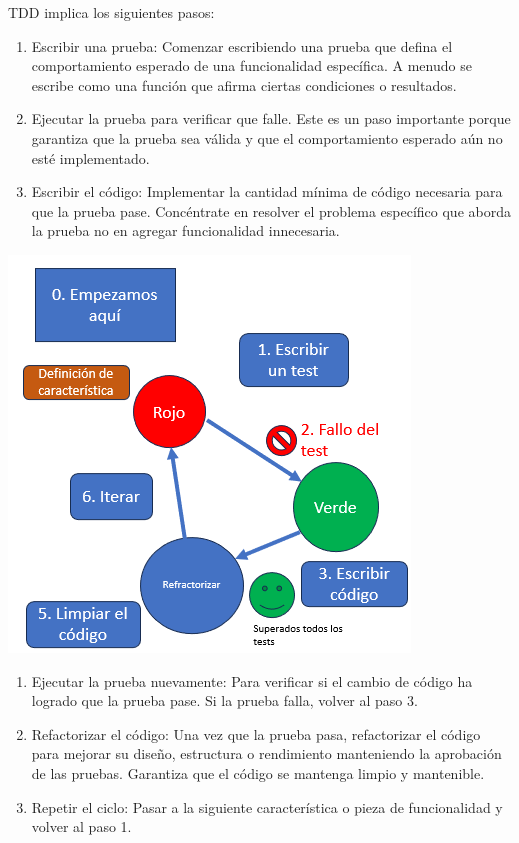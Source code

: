 \begin{minipage}{0.6\textwidth}
	TDD implica los siguientes pasos:
\begin{enumerate}[label=\arabic*)]
	\item Escribir una prueba: Comenzar escribiendo una prueba que defina el comportamiento esperado de una funcionalidad específica. A menudo se escribe como una función que afirma ciertas condiciones o resultados.
	\item Ejecutar la prueba para verificar que falle. Este es un paso importante porque garantiza que la prueba sea válida y que el comportamiento esperado aún no esté implementado.
	\item Escribir el código: Implementar la cantidad mínima de código necesaria para que la prueba pase. Concéntrate en resolver el problema específico que aborda la prueba no en agregar funcionalidad innecesaria.
\end{enumerate}
\end{minipage}\qquad\begin{minipage}{0.35\textwidth}
\begin{center}
	\includegraphics[width=\linewidth]{"Temas/Tema 1/screenshot013"}
\end{center}
\end{minipage}
\begin{enumerate}[label=\arabic*),start=4]
	\item Ejecutar la prueba nuevamente: Para verificar si el cambio de código ha logrado que la prueba pase. Si la prueba falla, volver al paso 3.
	\item Refactorizar el código: Una vez que la prueba pasa, refactorizar el código para mejorar su diseño, estructura o rendimiento manteniendo la aprobación de las pruebas. Garantiza que el código se mantenga limpio y mantenible.
	\item Repetir el ciclo: Pasar a la siguiente característica o pieza de funcionalidad y volver al paso 1.
\end{enumerate}
